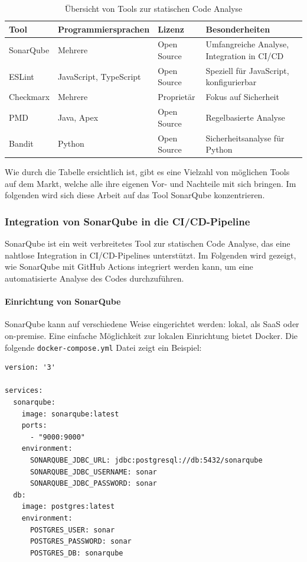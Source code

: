 \begin{table}[h!]
\centering
\begin{tabular}{|l|l|l|l|}
\hline
\textbf{Tool} & \textbf{Programmiersprachen} & \textbf{Lizenz} & \textbf{Besonderheiten} \\ \hline
SonarQube & Mehrere & Open Source & Umfangreiche Analyse, Integration in CI/CD \\ \hline
ESLint & JavaScript, TypeScript & Open Source & Speziell für JavaScript, konfigurierbar \\ \hline
Checkmarx & Mehrere & Proprietär & Fokus auf Sicherheit \\ \hline
PMD & Java, Apex & Open Source & Regelbasierte Analyse \\ \hline
Bandit & Python & Open Source & Sicherheitsanalyse für Python \\ \hline
\end{tabular}
\caption{Übersicht von Tools zur statischen Code Analyse}
\label{tab:static_code_analysis_tools}
\end{table}

Wie durch die Tabelle ersichtlich ist, gibt es eine Vielzahl von möglichen Tools auf dem Markt, welche alle ihre eigenen Vor- und Nachteile mit sich bringen. Im folgenden wird sich diese Arbeit auf das Tool SonarQube konzentrieren.

\subsubsection{Integration von SonarQube in die CI/CD-Pipeline}

SonarQube ist ein weit verbreitetes Tool zur statischen Code Analyse, das eine nahtlose Integration in CI/CD-Pipelines unterstützt. Im Folgenden wird gezeigt, wie SonarQube mit GitHub Actions integriert werden kann, um eine automatisierte Analyse des Codes durchzuführen.

\paragraph{Einrichtung von SonarQube}

SonarQube kann auf verschiedene Weise eingerichtet werden: lokal, als SaaS oder on-premise. Eine einfache Möglichkeit zur lokalen Einrichtung bietet Docker. Die folgende \texttt{docker-compose.yml} Datei zeigt ein Beispiel:

\begin{lstlisting}
version: '3'

services:
  sonarqube:
    image: sonarqube:latest
    ports:
      - "9000:9000"
    environment:
      SONARQUBE_JDBC_URL: jdbc:postgresql://db:5432/sonarqube
      SONARQUBE_JDBC_USERNAME: sonar
      SONARQUBE_JDBC_PASSWORD: sonar
  db:
    image: postgres:latest
    environment:
      POSTGRES_USER: sonar
      POSTGRES_PASSWORD: sonar
      POSTGRES_DB: sonarqube
\end{lstlisting}

